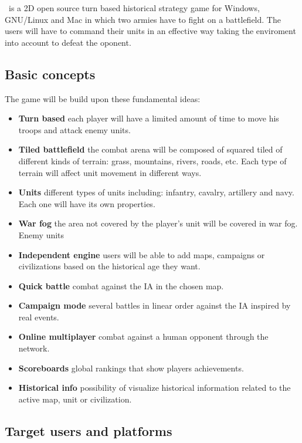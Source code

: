 
\game\ is a 2D open source turn based historical strategy game for
Windows, GNU/Linux and Mac in which two armies have to fight on a
battlefield. The users will have to command their units in an effective
way taking the enviroment into account to defeat the oponent.\\

\subsection{Basic concepts}

The game will be build upon these fundamental ideas:

\begin{itemize}
    \item \textbf{Turn based} each player will have a limited amount of time to
    move his troops and attack enemy units.
    \item \textbf{Tiled battlefield} the combat arena will be composed of squared
    tiled of different kinds of terrain: grass, mountains, rivers, roads,
    etc. Each type of terrain will affect unit movement in different ways.
    \item \textbf{Units} different types of units including: infantry, cavalry,
    artillery and navy. Each one will have its own properties.
    \item \textbf{War fog} the area not covered by the player's unit will be covered
    in war fog. Enemy units 
    \item \textbf{Independent engine} users will be able to add maps, campaigns
    or civilizations based on the historical age they want.
    \item \textbf{Quick battle} combat against the IA in the chosen map.
    \item \textbf{Campaign mode} several battles in linear order against the IA
    inspired by real events.
    \item \textbf{Online multiplayer} combat against a human opponent through the
    network.
    \item \textbf{Scoreboards} global rankings that show players achievements.
    \item \textbf{Historical info} possibility of visualize historical information
    related to the active map, unit or civilization.
\end{itemize}

\subsection{Target users and platforms}

